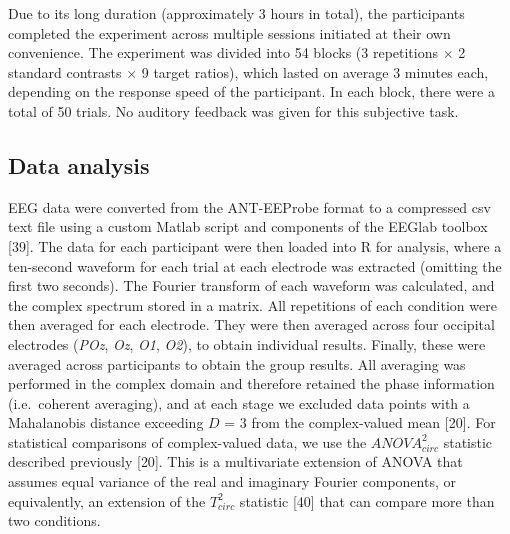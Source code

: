 \documentclass[
]{article}
\begin{document}
Due to its long duration (approximately 3 hours in total), the participants completed the experiment across multiple sessions initiated at their own convenience. The experiment was divided into 54 blocks (3 repetitions \(\times\) 2 standard contrasts \(\times\) 9 target ratios), which lasted on average 3 minutes each, depending on the response speed of the participant. In each block, there were a total of 50 trials. No auditory feedback was given for this subjective task.

\hypertarget{data-analysis}{%
\subsection{Data analysis}\label{data-analysis}}

EEG data were converted from the ANT-EEProbe format to a compressed csv text file using a custom Matlab script and components of the EEGlab toolbox {[}39{]}. The data for each participant were then loaded into R for analysis, where a ten-second waveform for each trial at each electrode was extracted (omitting the first two seconds). The Fourier transform of each waveform was calculated, and the complex spectrum stored in a matrix. All repetitions of each condition were then averaged for each electrode. They were then averaged across four occipital electrodes (\emph{POz}, \emph{Oz}, \emph{O1}, \emph{O2}), to obtain individual results. Finally, these were averaged across participants to obtain the group results. All averaging was performed in the complex domain and therefore retained the phase information (i.e.~coherent averaging), and at each stage we excluded data points with a Mahalanobis distance exceeding \(D\) = 3 from the complex-valued mean {[}20{]}. For statistical comparisons of complex-valued data, we use the \(ANOVA^2_{circ}\) statistic described previously {[}20{]}. This is a multivariate extension of ANOVA that assumes equal variance of the real and imaginary Fourier components, or equivalently, an extension of the \(T^2_{circ}\) statistic {[}40{]} that can compare more than two conditions.
\end{document}
